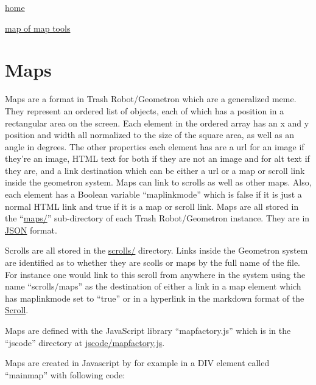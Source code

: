 \href{index.html}{home}

\href{maps/maps}{map of map tools}

\section{Maps}\label{maps}

Maps are a format in Trash Robot/Geometron which are a generalized meme.
They represent an ordered list of objects, each of which has a position
in a rectangular area on the screen. Each element in the ordered array
has an x and y position and width all normalized to the size of the
square area, as well as an angle in degrees. The other properties each
element has are a url for an image if they're an image, HTML text for
both if they are not an image and for alt text if they are, and a link
destination which can be either a url or a map or scroll link inside the
geometron system. Maps can link to scrolls as well as other maps. Also,
each element has a Boolean variable ``maplinkmode'' which is false if it
is just a normal HTML link and true if it is a map or scroll link. Maps
are all stored in the ``\url{maps/}'' sub-directory of each Trash
Robot/Geometron instance. They are in
\href{https://www.json.org/json-en.html}{JSON} format.

Scrolls are all stored in the \url{scrolls/} directory. Links inside the
Geometron system are identified as to whether they are scolls or maps by
the full name of the file. For instance one would link to this scroll
from anywhere in the system using the name ``scrolls/maps'' as the
destination of either a link in a map element which has maplinkmode set
to ``true'' or in a hyperlink in the markdown format of the
\href{scrolls/scrolls}{Scroll}.

Maps are defined with the JavaScript library ``mapfactory.js'' which is
in the ``jscode'' directory at \url{jscode/mapfactory.js}.

Maps are created in Javascript by for example in a DIV element called
``mainmap'' with following code:

